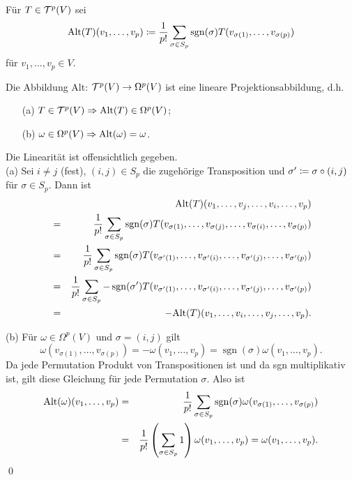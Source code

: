 \documentclass[a4paper,twoside,DIV15,BCOR12mm]{scrbook}
\DeclareMathOperator{\sgn}{sgn}
\begin{document}
\bigskip

 Für $T \in {\cal T}^{p}(V)$ sei
\[ {\rm Alt}(T)(v_{1},\dots,v_{p}) \da  \frac{1}{p!} \sum_{\sigma \in 
S_{p}} \sgn (\sigma) T(v_{\sigma(1)},\dots,v_{\sigma(p)}) \]
für $v_1,\ldots,v_p\in V$.\\

\bigskip

\begin{satz}\label{Satz3.3.2} {Die Abbildung {\rm Alt}: ${\cal T}^{p}(V) 
\to \Omega^{p}(V)$ ist eine lineare Projektionsabbildung, d.h.}
\begin{enumerate}
\item[{\rm (a)}] $T \in {\cal T}^{p}(V) \Rightarrow {\rm Alt}(T) \in 
\Omega^{p}(V)$;
\item[{\rm (b)}] $\omega \in \Omega^{p}(V) \Rightarrow {\rm Alt}(\omega) = \omega$.
\end{enumerate}
\end{satz}

\bigskip

 Die Linearität ist offensichtlich gegeben.\\

\noindent
(a) Sei $i \not= j$ (fest), $(i,j) \in S_{p}$ die zugehörige 
Transposition und $\sigma' \da  \sigma \circ (i,j)$ für $\sigma \in 
S_{p}$. Dann ist
\begin{eqnarray*} 
&   & {\rm Alt}(T) (v_{1},\dots,v_{j},\dots,v_{i},\dots,v_{p}) \\
& = & \frac{1}{p!} \sum_{\sigma \in S_{p}} \sgn (\sigma) 
T(v_{\sigma(1)},\dots,v_{\sigma(j)},\dots,v_{\sigma(i)},\dots,v_{\sigma(p)}) \\
& = & \frac{1}{p!} \sum_{\sigma \in S_{p}} \sgn (\sigma) 
T(v_{\sigma'(1)},\dots,v_{\sigma'(i)},\dots,v_{\sigma'(j)},
\dots,v_{\sigma'(p)}) \\
& = & \frac{1}{p!} \sum_{\sigma \in S_{p}} - \sgn (\sigma') 
T(v_{\sigma'(1)},\dots,v_{\sigma'(i)},
\dots,v_{\sigma'(j)},\dots,v_{\sigma'(p)}) \\
& = & -{\rm Alt}(T)(v_{1},\dots,v_{i},\dots,v_{j},\dots,v_{p}).
\end{eqnarray*}

\noindent
(b) Für $\omega \in \Omega^{p}(V)$ und $\sigma = (i,j)$ gilt
\[ \omega(v_{\sigma(1)},\dots,v_{\sigma(p)}) = 
-\omega(v_{1},\dots,v_{p}) = \sgn (\sigma) 
\omega(v_{1},\dots,v_{p}). \]
Da jede Permutation Produkt von Transpositionen ist und da sgn 
multiplikativ ist, gilt diese Gleichung für jede Permutation 
$\sigma$. Also ist
\begin{eqnarray*}
{\rm Alt}(\omega)(v_{1},\dots,v_{p}) & = & \frac{1}{p!} \sum_{\sigma 
\in S_{p}} \sgn (\sigma) 
\omega(v_{\sigma(1)},\dots,v_{\sigma(p)}) \\
& = & \frac{1}{p!} \left(\sum_{\sigma \in S_{p}} 1\right) 
\omega(v_{1},\dots,v_{p}) = \omega(v_{1},\dots,v_{p}).
\end{eqnarray*}
\qed\\
\end{document}
